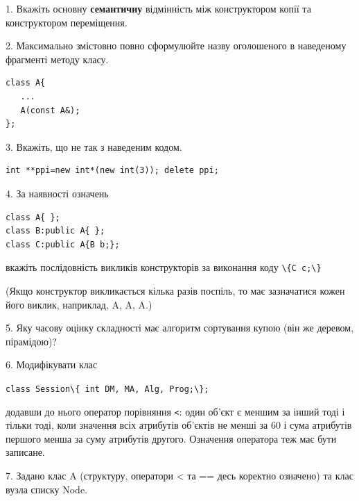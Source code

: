 \documentclass[12pt, ukrainian]{article}
\def\code#1{\Verb!#1!}
\begin{document}
{%
1. Вкажіть основну \textbf{семантичну} відмінність між конструктором копії та конструктором переміщення.%
\par
\vspace{2mm}
2. Максимально змістовно повно сформулюйте назву оголошеного в наведеному фрагменті методу класу.
\vspace{-3mm}
\begin{verbatim}class A{
   ...
   A(const A&);
};\end{verbatim}
\vspace{-3mm}
\par
\vspace{2mm}
3. Вкажіть, що не так з наведеним кодом.
\vspace{-3mm}
\begin{verbatim}int **ppi=new int*(new int(3)); delete ppi;\end{verbatim}
\vspace{-3mm}
\par
\vspace{2mm}
4. За наявності означень
\vspace{-3mm}
\begin{verbatim}
class A{ };
class B:public A{ };
class C:public A{B b;};\end{verbatim}
\vspace{-3mm}
вкажіть послідовність викликів конструкторів за виконання коду \code{\{C c;\}} 

(Якщо конструктор викликається кілька разів поспіль, то має зазначатися кожен його виклик, наприклад, A, A, A.)

\vspace{2mm}
5. Яку часову оцінку складності має алгоритм сортування купою (він же деревом, пірамідою)?
\par
\vspace{2mm}
6. Модифікувати клас 

\qquad\code{class Session\{ int DM, MA, Alg, Prog;\};} 


додавши до нього оператор порівняння \code{<}: один об'єкт є меншим за інший тоді і тільки тоді, коли значення всіх атрибутів об'єктів не менші за 60 і сума атрибутів першого менша за суму атрибутів другого. Означення оператора теж має бути записане.%
\par
\vspace{2mm}
7. 
Задано клас A (структуру, оператори < та == десь коректно означено) та клас вузла списку Node.

}
\end{document}
